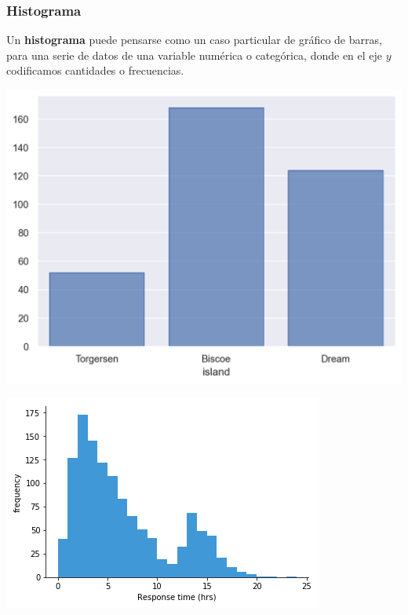 \documentclass[aspectratio=169,12pt]{beamer}
\begin{document}
\begin{frame}
\frametitle{Histograma}

Un \textbf{histograma} puede pensarse como un caso particular de gráfico de barras, para una serie de datos de una variable numérica o categórica, donde en el eje $y$ codificamos cantidades o frecuencias.

\vspace{0.5cm}

\begin{minipage}{.45\textwidth}
\begin{center}
\includegraphics[scale=0.30]{clase4-histograma_categorico.png}
\end{center}
\end{minipage} \hspace{1cm} %
\begin{minipage}{.45\textwidth}
\begin{center}
\includegraphics[scale=1.5]{clase4-histogram-example-1.png}
\end{center}
\end{minipage}

\end{frame}
\end{document}
